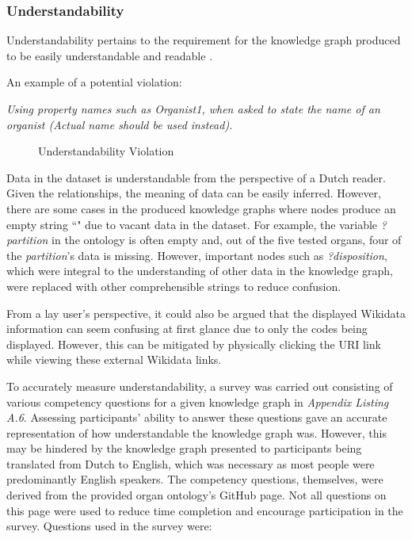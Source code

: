 \subsubsection{Understandability}
\hspace{0.5cm} Understandability pertains to the requirement for the knowledge graph produced to be easily understandable and readable \cite{knowledgegraphevaulationbook}.

\noindent An example of a potential violation: 
\vspace{-0.1cm}
\begin{displayquote}
    \textit{Using property names such as Organist1, when asked to state the name of an organist (Actual name should be used instead).}
\end{displayquote}

\begin{figure}[H]
\begin{center}
\end{center}
\vspace{-0.5cm}
\caption{Understandability Violation}
\end{figure}

Data in the dataset is understandable from the perspective of a Dutch reader. Given the relationships, the meaning of data can be easily inferred. However, there are some cases in the produced knowledge graphs where nodes produce an empty string ``" due to vacant data in the dataset. For example, the variable \textit{?partition} in the ontology is often empty and, out of the five tested organs, four of the \textit{partition}'s data is missing. However, important nodes such as \textit{?disposition}, which were integral to the understanding of other data in the knowledge graph, were replaced with other comprehensible strings to reduce confusion. 

From a lay user's perspective, it could also be argued that the displayed Wikidata information can seem confusing at first glance due to only the codes being displayed. However, this can be mitigated by physically clicking the URI link while viewing these external Wikidata links. 

To accurately measure understandability, a survey was carried out consisting of various competency questions for a given knowledge graph in \textit{Appendix Listing A.6}. Assessing participants' ability to answer these questions gave an accurate representation of how understandable the knowledge graph was. However, this may be hindered by the knowledge graph presented to participants being translated from Dutch to English, which was necessary as most people were predominantly English speakers. The competency questions, themselves, were derived from the provided organ ontology's GitHub page. Not all questions on this page were used to reduce time completion and encourage participation in the survey. Questions used in the survey were:

